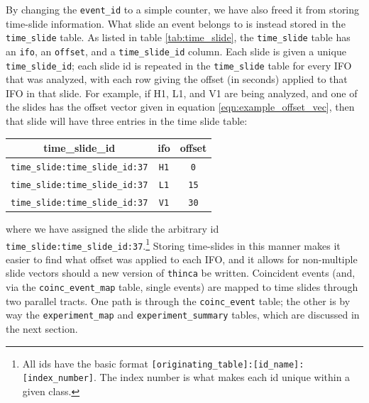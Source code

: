 By changing the \texttt{event\_id} to a simple counter, we have also freed it from storing time-slide information. What slide an event belongs to is instead stored in the \texttt{time\_slide} table. As listed in table \ref{tab:time_slide}, the \texttt{time\_slide} table has an \texttt{ifo}, an \texttt{offset}, and a \texttt{time\_slide\_id} column. Each slide is given a unique \texttt{time\_slide\_id}; each slide id is repeated in the \texttt{time\_slide} table for every \ac{IFO} that was analyzed, with each row giving the offset (in seconds) applied to that \ac{IFO} in that slide. For example, if H1, L1, and V1 are being analyzed, and one of the slides has the offset vector given in equation \ref{eqn:example_offset_vec}, then that slide will have three entries in the time slide table:
\begin{center}
\begin{tabular}{ c | c | c }
time\_slide\_id & ifo & offset \\
\hline\hline
\texttt{time\_slide:time\_slide\_id:37} &   \texttt{H1}    & \texttt{0} \\
\texttt{time\_slide:time\_slide\_id:37} &   \texttt{L1}    & \texttt{15} \\
\texttt{time\_slide:time\_slide\_id:37} &   \texttt{V1}    & \texttt{30} \\
\end{tabular}
\end{center}
where we have assigned the slide the arbitrary id \texttt{time\_slide:time\_slide\_id:37}.\footnote{All ids have the basic format \texttt{[originating\_table]:[id\_name]:[index\_number]}. The index number is what makes each id unique within a given class.} Storing time-slides in this manner makes it easier to find what offset was applied to each \ac{IFO}, and it allows for non-multiple slide vectors should a new version of \texttt{thinca} be written. Coincident events (and, via the \texttt{coinc\_event\_map} table, single events) are mapped to time slides through two parallel tracts. One path is through the \texttt{coinc\_event} table; the other is by way the \texttt{experiment\_map} and \texttt{experiment\_summary} tables, which are discussed in the next section.


